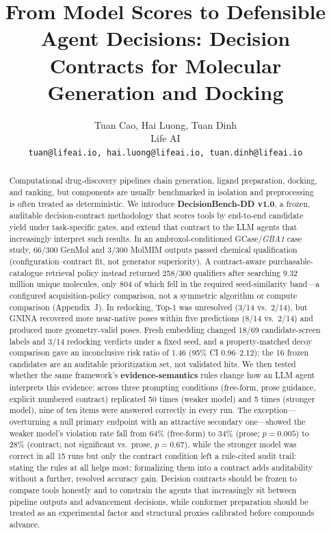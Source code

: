 \documentclass{article}
\title{From Model Scores to Defensible Agent Decisions: Decision Contracts for Molecular Generation and Docking}
\author{%
  Tuan Cao, Hai Luong, Tuan Dinh \\
  Life AI \\
  \texttt{tuan@lifeai.io, hai.luong@lifeai.io, tuan.dinh@lifeai.io}
}
\begin{document}
\maketitle

\begin{abstract}
Computational drug-discovery pipelines chain generation, ligand preparation, docking, and ranking, but components are usually benchmarked in isolation and preprocessing is often treated as deterministic. We introduce \textbf{DecisionBench-DD v1.0}, a frozen, auditable decision-contract methodology that scores tools by end-to-end candidate yield under task-specific gates, and extend that contract to the LLM agents that increasingly interpret such results. In an ambroxol-conditioned GCase/\textit{GBA1} case study, 66/300 GenMol and 3/300 MolMIM outputs passed chemical qualification (configuration--contract fit, not generator superiority). A contract-aware purchasable-catalogue retrieval policy instead returned 258/300 qualifiers after searching 9.32 million unique molecules, only 804 of which fell in the required seed-similarity band---a configured acquisition-policy comparison, not a symmetric algorithm or compute comparison (Appendix~J). In redocking, Top-1 was unresolved (3/14 vs.\ 2/14), but GNINA recovered more near-native poses within five predictions (8/14 vs.\ 2/14) and produced more geometry-valid poses. Fresh embedding changed 18/69 candidate-screen labels and 3/14 redocking verdicts under a fixed seed, and a property-matched decoy comparison gave an inconclusive risk ratio of 1.46 (95\% CI 0.96--2.12); the 16 frozen candidates are an auditable prioritization set, not validated hits. We then tested whether the same framework's \textbf{evidence-semantics} rules change how an LLM agent interprets this evidence: across three prompting conditions (free-form, prose guidance, explicit numbered contract) replicated 50 times (weaker model) and 5 times (stronger model), nine of ten items were answered correctly in every run. The exception---overturning a null primary endpoint with an attractive secondary one---showed the weaker model's violation rate fall from 64\% (free-form) to 34\% (prose; $p=0.005$) to 28\% (contract; not significant vs.\ prose, $p=0.67$), while the stronger model was correct in all 15 runs but only the contract condition left a rule-cited audit trail: stating the rules at all helps most; formalizing them into a contract adds auditability without a further, resolved accuracy gain. Decision contracts should be frozen to compare tools honestly and to constrain the agents that increasingly sit between pipeline outputs and advancement decisions, while conformer preparation should be treated as an experimental factor and structural proxies calibrated before compounds advance.
\end{abstract}
\end{document}
